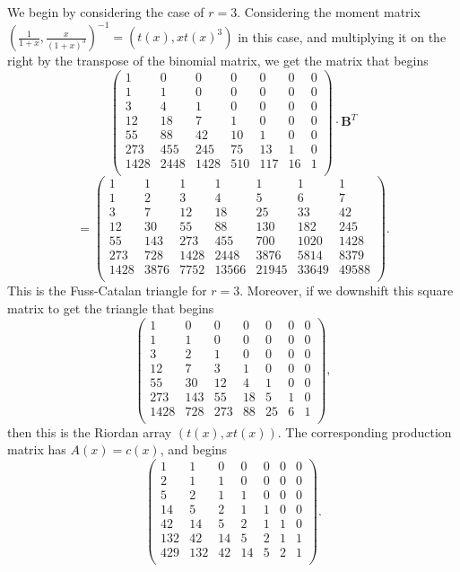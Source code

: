 \documentclass[12pt,reqno]{article}
\theoremstyle{definition}
\begin{document}
We begin by considering the case of $r=3$. Considering the moment matrix $\left(\frac{1}{1+x}, \frac{x}{(1+x)^3}\right)^{-1}=(t(x), xt(x)^3)$  in this case, and multiplying it on the right by the transpose of the binomial matrix, we get the matrix that begins
$$\left(
\begin{array}{ccccccc}
1& 0 & 0 & 0 & 0 & 0 & 0 \\
1 & 1 & 0 & 0 & 0 & 0 & 0 \\
3 & 4 & 1 & 0 & 0 & 0 & 0 \\
12 & 18 & 7 & 1 & 0 & 0 & 0 \\
55 & 88 & 42 & 10 & 1 & 0 & 0 \\
273 & 455 & 245 & 75 & 13 & 1 & 0 \\
1428 & 2448 & 1428 & 510 & 117 & 16 & 1 \\
\end{array}\right) \cdot \mathbf{B}^T$$
$$=\left(
\begin{array}{ccccccc}
1 &1 & 1 & 1 & 1 & 1 & 1 \\
1 & 2 & 3 & 4 & 5 & 6 & 7 \\
3 & 7 & 12 & 18 & 25 & 33 & 42 \\
12 & 30 & 55 & 88 & 130 & 182 & 245 \\
55 & 143 & 273 & 455 & 700 & 1020 & 1428 \\
273 & 728 & 1428 & 2448 & 3876 & 5814 & 8379 \\
1428 & 3876 &7752 & 13566 & 21945 & 33649 & 49588 \\
\end{array}\right).$$
This is the Fuss-Catalan triangle for $r=3$. Moreover, if we downshift this square matrix to get the triangle that begins
$$\left(
\begin{array}{ccccccc}
1& 0 & 0 & 0 & 0 & 0 & 0 \\
1 & 1 & 0 & 0 & 0 & 0 & 0 \\
3 & 2 & 1 & 0 & 0 & 0 & 0 \\
12 & 7 & 3 & 1 & 0 & 0 & 0 \\
55 & 30 & 12 & 4 & 1 & 0 & 0 \\
273 & 143 & 55 & 18 & 5 & 1 & 0 \\
1428 & 728 & 273 & 88 & 25 & 6 & 1 \\
\end{array}\right),$$
then this is the Riordan array $(t(x), xt(x))$. The corresponding production matrix has $A(x)=c(x)$, and begins
$$\left(
\begin{array}{ccccccc}
1& 1 & 0 & 0 & 0 & 0 & 0 \\
2 & 1 & 1 & 0 & 0 & 0 & 0 \\
5 & 2 & 1 & 1 & 0 & 0 & 0 \\
14 & 5 & 2 & 1 & 1 & 0 & 0 \\
42 & 14 & 5 & 2 & 1 & 1 & 0 \\
132 & 42 & 14 & 5 & 2 & 1 & 1 \\
429 & 132 & 42 & 14 & 5 & 2 & 1 \\
\end{array}\right).$$
\end{document}
